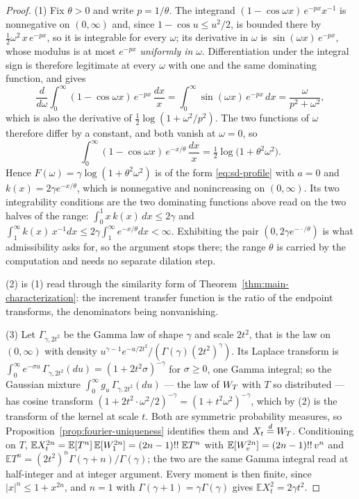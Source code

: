 \begin{proof}
(1) Fix $\theta > 0$ and write $p = 1/\theta$. The integrand
$(1 - \cos\omega x)\,e^{-px}x^{-1}$ is nonnegative on $(0,\infty)$ and, since
$1 - \cos u \le u^2/2$, is bounded there by $\tfrac12\omega^2\,x\,e^{-px}$, so it is integrable
for every $\omega$; its derivative in $\omega$ is $\sin(\omega x)\,e^{-px}$, whose modulus is at
most $e^{-px}$ \emph{uniformly in} $\omega$. Differentiation under the integral sign is
therefore legitimate at every $\omega$ with one and the same dominating function, and gives
\[
  \frac{d}{d\omega}\int_0^\infty (1 - \cos\omega x)\,e^{-px}\,\frac{dx}{x}
   = \int_0^\infty \sin(\omega x)\,e^{-px}\,dx = \frac{\omega}{p^2+\omega^2},
\]
which is also the derivative of $\tfrac12\log(1 + \omega^2/p^2)$. The two functions of $\omega$
therefore differ by a constant, and both vanish at $\omega = 0$, so
\[
  \int_0^\infty (1 - \cos\omega x)\,e^{-x/\theta}\,\frac{dx}{x}
   = \tfrac12\log\bigl(1 + \theta^2\omega^2\bigr).
\]
Hence $F(\omega) = \gamma\log(1+\theta^2\omega^2)$ is of the form \ref{eq:sd-profile} with
$a = 0$ and $k(x) = 2\gamma e^{-x/\theta}$, which is nonnegative and nonincreasing on
$(0,\infty)$. Its two integrability conditions are the two dominating functions above read on
the two halves of the range: $\int_0^1 x\,k(x)\,dx \le 2\gamma$ and
$\int_1^\infty k(x)\,x^{-1}dx \le 2\gamma\int_1^\infty e^{-x/\theta}dx < \infty$. Exhibiting the
pair $(0, 2\gamma e^{-\cdot/\theta})$ is what admissibility asks for, so the argument stops
there; the range $\theta$ is carried by the computation and needs no separate dilation step.

(2) is (1) read through the similarity form of Theorem~\ref{thm:main-characterization}: the
increment transfer function is the ratio of the endpoint transforms, the denominators being
nonvanishing.

(3) Let $\Gamma_{\gamma,2t^2}$ be the Gamma law of shape $\gamma$ and scale $2t^2$, that is the
law on $(0,\infty)$ with density $u^{\gamma-1}e^{-u/2t^2}/(\Gamma(\gamma)(2t^2)^{\gamma})$. Its
Laplace transform is $\int_0^\infty e^{-\sigma u}\,\Gamma_{\gamma,2t^2}(du) =
(1 + 2t^2\sigma)^{-\gamma}$ for $\sigma \ge 0$, one Gamma integral; so the Gaussian mixture
$\int_0^\infty g_u\,\Gamma_{\gamma,2t^2}(du)$ --- the law of $W_T$ with $T$ so distributed ---
has cosine transform $(1 + 2t^2\cdot\omega^2/2)^{-\gamma} = (1 + t^2\omega^2)^{-\gamma}$, which
by (2) is the transform of the kernel at scale $t$. Both are symmetric probability measures, so
Proposition~\ref{prop:fourier-uniqueness} identifies them and $X_t \stackrel{d}{=} W_T$. Conditioning on
$T$, $\mathbb{E}X_t^{2n} = \mathbb{E}[T^n]\,\mathbb{E}[W_1^{2n}] = (2n-1)!!\;\mathbb{E}T^n$
with $\mathbb{E}[W_v^{2n}] = (2n-1)!!\,v^n$ and
$\mathbb{E}T^n = (2t^2)^n\Gamma(\gamma+n)/\Gamma(\gamma)$; the two are the same Gamma integral
read at half-integer and at integer argument. Every moment is then finite, since
$|x|^n \le 1 + x^{2n}$, and $n = 1$ with $\Gamma(\gamma+1) = \gamma\Gamma(\gamma)$ gives
$\mathbb{E}X_t^2 = 2\gamma t^2$.


\end{proof}

